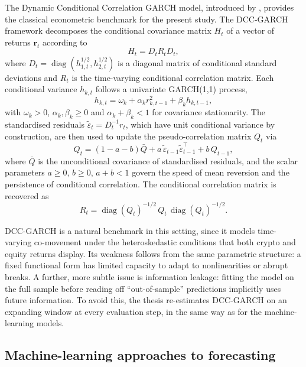 The Dynamic Conditional Correlation GARCH model, introduced by \textcite{engle2002}, provides the classical econometric benchmark for the present study. The DCC-GARCH framework decomposes the conditional covariance matrix $H_t$ of a vector of returns $\mathbf{r}_t$ according to
\begin{equation}
    H_t = D_t R_t D_t,
\end{equation}
where $D_t = \operatorname{diag}(h_{1,t}^{1/2}, h_{2,t}^{1/2})$ is a diagonal matrix of conditional standard deviations and $R_t$ is the time-varying conditional correlation matrix. Each conditional variance $h_{k,t}$ follows a univariate GARCH(1,1) process,
\begin{equation}
    h_{k,t} = \omega_k + \alpha_k r_{k,t-1}^{2} + \beta_k h_{k,t-1},
\end{equation}
with $\omega_k > 0$, $\alpha_k, \beta_k \geq 0$ and $\alpha_k + \beta_k < 1$ for covariance stationarity. The standardised residuals $\tilde{\varepsilon}_t = D_t^{-1} r_t$, which have unit conditional variance by construction, are then used to update the pseudo-correlation matrix $Q_t$ via
\begin{equation}
    Q_t = (1 - a - b)\bar{Q} + a\,\tilde{\varepsilon}_{t-1}\tilde{\varepsilon}_{t-1}^{\top} + b\, Q_{t-1},
\end{equation}
where $\bar{Q}$ is the unconditional covariance of standardised residuals, and the scalar parameters $a \geq 0$, $b \geq 0$, $a + b < 1$ govern the speed of mean reversion and the persistence of conditional correlation. The conditional correlation matrix is recovered as
\begin{equation}
    R_t = \operatorname{diag}(Q_t)^{-1/2}\, Q_t\, \operatorname{diag}(Q_t)^{-1/2}.
\end{equation}

DCC-GARCH is a natural benchmark in this setting, since it models time-varying co-movement under the heteroskedastic conditions that both crypto and equity returns display. Its weakness follows from the same parametric structure: a fixed functional form has limited capacity to adapt to nonlinearities or abrupt breaks. A further, more subtle issue is information leakage: fitting the model on the full sample before reading off ``out-of-sample'' predictions implicitly uses future information. To avoid this, the thesis re-estimates DCC-GARCH on an expanding window at every evaluation step, in the same way as for the machine-learning models.

\subsection{Machine-learning approaches to forecasting}

